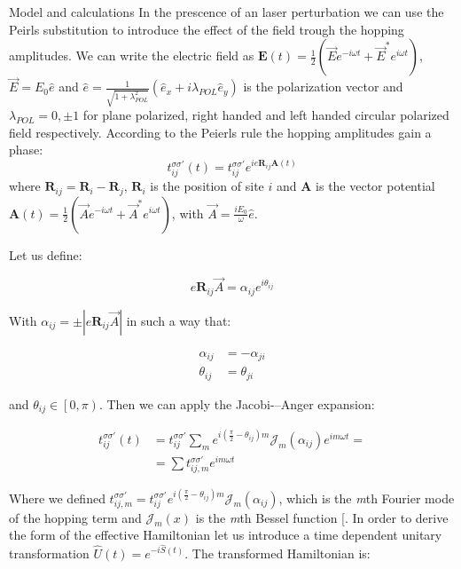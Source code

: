 \documentclass[aps,prl,twocolumn,amsmath,amssymb,superscriptaddress,nobibnotes]{revtex4}%
\renewcommand{\cite}[1]{{[}\onlinecite{#1}{]}}
\newcommand{\n}{\nonumber}
\newcommand{\bs}{\boldsymbol}
\begin{document}
\begin{section}{Model and calculations}
In the prescence of an laser perturbation we can use the Peirls substitution to introduce the effect of the field trough the hopping amplitudes. We can write the electric field as $\bs{E}(t) = \frac{1}{2}(\vec{E}e^{-i\omega t}+\vec{E}^*e^{i\omega t})$, $\vec{E} = E_0\hat{e}$ and $\hat{e} = \frac{1}{\sqrt{1+\lambda_{POL}^2}}(\hat{e}_x+i\lambda_{POL}\hat{e}_y)$ is the polarization vector and $\lambda_{POL} = 0, \pm 1$ for plane polarized, right handed and left handed circular polarized field respectively. According to the Peierls rule the hopping amplitudes gain a phase:
\begin{equation}
t_{ij}^{\sigma \sigma'}(t) = t_{ij}^{\sigma \sigma'} e^{ie\bs{R}_{ij}\bs{A}(t)}
\end{equation}
where $\bs{R}_{ij} = \bs{R}_i-\bs{R}_j$, $\bs{R}_i$ is the position of site $i$ and $\bs{A}$ is the vector potential $\bs{A}(t) = \frac{1}{2}(\vec{A}e^{-i\omega t} + \vec{A}^* e^{i\omega t})$, with $\vec{A} = \frac{iE_0}{\omega}\hat{e}$.

Let us define:

\begin{equation}
\label{Def_alpha}
e\bs{R}_{ij}\vec{A} = \alpha_{ij} e^{i \theta_{ij}}
\end{equation}

With $\alpha_{ij} = \pm|e\bs{R}_{ij}\vec{A}|$ in such a way that:

\begin{align}
\alpha_{ij} &= -\alpha_{ji} \label{alphaSym} \\
\theta_{ij} &= \theta_{ji} \label{thetaSym}
\end{align}

and $\theta_{ij} \in \left[0,\pi\right)$. Then we can apply the Jacobi-–Anger expansion:

\begin{align}
t_{ij}^{\sigma \sigma'}(t) &= t_{ij}^{\sigma \sigma'}\sum_m e^{i(\frac{\pi}{2}-\theta_{ij})m} \mathcal{J}_m(\alpha_{ij}) e^{im\omega t} = \n \\
&= \sum t_{ij,m}^{\sigma \sigma'} e^{im\omega t}
\end{align}

Where we defined $t_{ij,m}^{\sigma \sigma'} = t_{ij}^{\sigma \sigma'} e^{i(\frac{\pi}{2}-\theta_{ij})m} \mathcal{J}_m(\alpha_{ij})$, which is the \textit{m}th Fourier mode of the hopping term and $\mathcal{J}_m(x)$ is the \textit{m}th Bessel function \cite{Kitamura2017}. In order to derive the form of the effective Hamiltonian let us introduce a time dependent unitary transformation $\hat{U}(t) = e^{-i\hat{S}(t)}$. The transformed Hamiltonian is:


\end{section}
\end{document}
